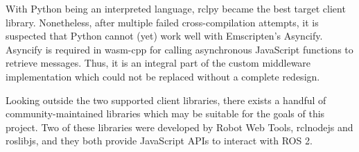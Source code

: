     With Python being an interpreted language, \textsf{rclpy} became the best target client library. Nonetheless, after multiple failed cross-compilation attempts, it is suspected that Python cannot (yet) work well with Emscripten's Asyncify. Asyncify is required in \textsf{wasm-cpp} for calling asynchronous JavaScript functions to retrieve messages. Thus, it is an integral part of the custom middleware implementation which could not be replaced without a complete redesign. 

    Looking outside the two supported client libraries, there exists a handful of community-maintained libraries which may be suitable for the goals of this project. Two of these libraries were developed by Robot Web Tools, \textsf{rclnodejs} and \textsf{roslibjs}, and they both provide JavaScript \ac{API}s to interact with \ac{ROS} 2.